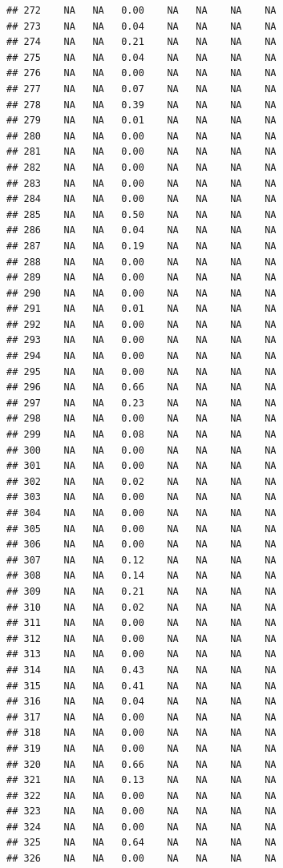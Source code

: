 \documentclass{article}\usepackage{graphicx, color}
\makeatletter
\newenvironment{kframe}{%
 \def\at@end@of@kframe{}%
 \ifinner\ifhmode%
  \def\at@end@of@kframe{\end{minipage}}%
  \begin{minipage}{\columnwidth}%
 \fi\fi%
 \def\FrameCommand##1{\hskip\@totalleftmargin \hskip-\fboxsep
 \colorbox{shadecolor}{##1}\hskip-\fboxsep
     \hskip-\linewidth \hskip-\@totalleftmargin \hskip\columnwidth}%
 \MakeFramed {\advance\hsize-\width
   \@totalleftmargin\z@ \linewidth\hsize
   \@setminipage}}%
 {\par\unskip\endMakeFramed%
 \at@end@of@kframe}
\newenvironment{knitrout}{}{} %
\makeatother
\begin{document}
\begin{knitrout}
\begin{kframe}
\begin{verbatim}
## 272    NA   NA   0.00    NA   NA    NA    NA
## 273    NA   NA   0.04    NA   NA    NA    NA
## 274    NA   NA   0.21    NA   NA    NA    NA
## 275    NA   NA   0.04    NA   NA    NA    NA
## 276    NA   NA   0.00    NA   NA    NA    NA
## 277    NA   NA   0.07    NA   NA    NA    NA
## 278    NA   NA   0.39    NA   NA    NA    NA
## 279    NA   NA   0.01    NA   NA    NA    NA
## 280    NA   NA   0.00    NA   NA    NA    NA
## 281    NA   NA   0.00    NA   NA    NA    NA
## 282    NA   NA   0.00    NA   NA    NA    NA
## 283    NA   NA   0.00    NA   NA    NA    NA
## 284    NA   NA   0.00    NA   NA    NA    NA
## 285    NA   NA   0.50    NA   NA    NA    NA
## 286    NA   NA   0.04    NA   NA    NA    NA
## 287    NA   NA   0.19    NA   NA    NA    NA
## 288    NA   NA   0.00    NA   NA    NA    NA
## 289    NA   NA   0.00    NA   NA    NA    NA
## 290    NA   NA   0.00    NA   NA    NA    NA
## 291    NA   NA   0.01    NA   NA    NA    NA
## 292    NA   NA   0.00    NA   NA    NA    NA
## 293    NA   NA   0.00    NA   NA    NA    NA
## 294    NA   NA   0.00    NA   NA    NA    NA
## 295    NA   NA   0.00    NA   NA    NA    NA
## 296    NA   NA   0.66    NA   NA    NA    NA
## 297    NA   NA   0.23    NA   NA    NA    NA
## 298    NA   NA   0.00    NA   NA    NA    NA
## 299    NA   NA   0.08    NA   NA    NA    NA
## 300    NA   NA   0.00    NA   NA    NA    NA
## 301    NA   NA   0.00    NA   NA    NA    NA
## 302    NA   NA   0.02    NA   NA    NA    NA
## 303    NA   NA   0.00    NA   NA    NA    NA
## 304    NA   NA   0.00    NA   NA    NA    NA
## 305    NA   NA   0.00    NA   NA    NA    NA
## 306    NA   NA   0.00    NA   NA    NA    NA
## 307    NA   NA   0.12    NA   NA    NA    NA
## 308    NA   NA   0.14    NA   NA    NA    NA
## 309    NA   NA   0.21    NA   NA    NA    NA
## 310    NA   NA   0.02    NA   NA    NA    NA
## 311    NA   NA   0.00    NA   NA    NA    NA
## 312    NA   NA   0.00    NA   NA    NA    NA
## 313    NA   NA   0.00    NA   NA    NA    NA
## 314    NA   NA   0.43    NA   NA    NA    NA
## 315    NA   NA   0.41    NA   NA    NA    NA
## 316    NA   NA   0.04    NA   NA    NA    NA
## 317    NA   NA   0.00    NA   NA    NA    NA
## 318    NA   NA   0.00    NA   NA    NA    NA
## 319    NA   NA   0.00    NA   NA    NA    NA
## 320    NA   NA   0.66    NA   NA    NA    NA
## 321    NA   NA   0.13    NA   NA    NA    NA
## 322    NA   NA   0.00    NA   NA    NA    NA
## 323    NA   NA   0.00    NA   NA    NA    NA
## 324    NA   NA   0.00    NA   NA    NA    NA
## 325    NA   NA   0.64    NA   NA    NA    NA
## 326    NA   NA   0.00    NA   NA    NA    NA

\end{verbatim}
\end{kframe}
\end{knitrout}
\end{document}
